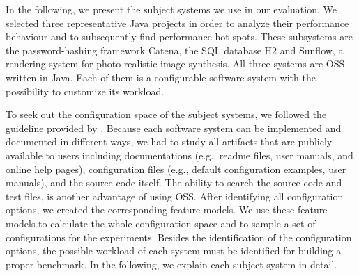 In the following, we present the subject systems we use in our evaluation. We selected three representative Java projects in order to analyze their performance behaviour and to subsequently find performance hot spots. These subsystems are the password-hashing framework Catena, the SQL database H2 and Sunflow, a rendering system for photo-realistic image synthesis. All three systems are \ac{OSS} written in Java. Each of them is a configurable software system with the possibility to customize its workload. 

To seek out the configuration space of the subject systems, we followed the guideline provided by \cite{Han:2016:ESP:2961111.2962602}. Because each software system can be implemented and documented in different ways, we had to study all artifacts that are publicly available to users including documentations (e.g., readme files, user manuals, and online help pages), configuration files (e.g., default configuration examples, user manuals), and the source code itself. The ability to search the source code and test files, is another advantage of using \ac{OSS}. After identifying all configuration options, we created the corresponding feature models. We use these feature models to calculate the whole configuration space and to sample a set of configurations for the experiments. Besides the identification of the configuration options, the possible workload of each system must be identified for building a proper benchmark. In the following, we explain each subject system in detail.



% 




